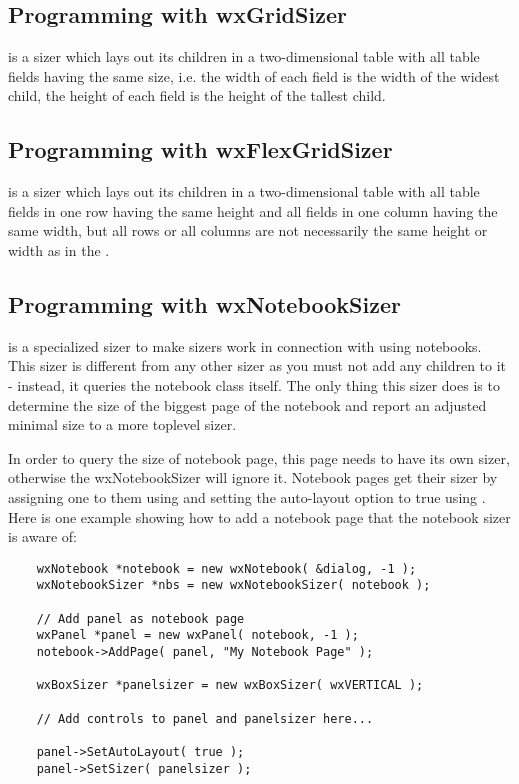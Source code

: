 \subsection{Programming with wxGridSizer}\label{gridsizerprogramming}

 is a sizer which lays out its children in a two-dimensional
table with all table fields having the same size,
i.e. the width of each field is the width of the widest child,
the height of each field is the height of the tallest child.

\subsection{Programming with wxFlexGridSizer}\label{flexgridsizerprogramming}

 is a sizer which lays out its children in a two-dimensional
table with all table fields in one row having the same
height and all fields in one column having the same width, but all
rows or all columns are not necessarily the same height or width as in
the .

\subsection{Programming with wxNotebookSizer}\label{notebooksizerprogramming}

 is a specialized sizer to make sizers work in connection
with using notebooks. This sizer is different from any other sizer as 
you must not add any children to it - instead, it queries the notebook class itself.
The only thing this sizer does is to determine the size of the biggest
page of the notebook and report an adjusted minimal size to a more toplevel
sizer.

In order to query the size of notebook page, this page needs to have its
own sizer, otherwise the wxNotebookSizer will ignore it. Notebook pages
get their sizer by assigning one to them using  
and setting the auto-layout option to true using 
. Here is one
example showing how to add a notebook page that the notebook sizer is
aware of:

\begin{verbatim}
    wxNotebook *notebook = new wxNotebook( &dialog, -1 );
    wxNotebookSizer *nbs = new wxNotebookSizer( notebook );

    // Add panel as notebook page
    wxPanel *panel = new wxPanel( notebook, -1 );
    notebook->AddPage( panel, "My Notebook Page" );

    wxBoxSizer *panelsizer = new wxBoxSizer( wxVERTICAL );

    // Add controls to panel and panelsizer here...

    panel->SetAutoLayout( true );
    panel->SetSizer( panelsizer );
\end{verbatim}

